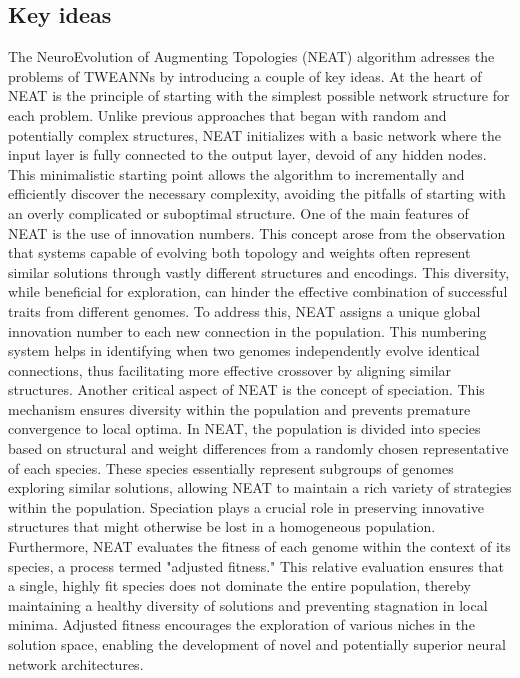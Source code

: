 \documentclass{article}
\begin{document}
\subsection{Key ideas}
The NeuroEvolution of Augmenting Topologies (NEAT) algorithm adresses the problems of TWEANNs by introducing a couple of key ideas.
At the heart of NEAT is the principle of starting with the simplest possible network structure for each problem. Unlike previous
approaches that began with random and potentially complex structures, NEAT initializes with a basic network where the input
layer is fully connected to the output layer, devoid of any hidden nodes. This minimalistic starting point allows the algorithm
to incrementally and efficiently discover the necessary complexity, avoiding the pitfalls of starting with an overly complicated or suboptimal structure.
One of the main features of NEAT is the use of innovation numbers. This concept arose from the observation that systems
capable of evolving both topology and weights often represent similar solutions through vastly different structures and encodings.
This diversity, while beneficial for exploration, can hinder the effective combination of successful traits from different genomes.
To address this, NEAT assigns a unique global innovation number to each new connection in the population. This numbering system helps 
in identifying when two genomes independently evolve identical connections, thus facilitating more effective crossover by aligning similar structures.
Another critical aspect of NEAT is the concept of speciation. This mechanism ensures diversity within the population and prevents
premature convergence to local optima. In NEAT, the population is divided into species based on structural and weight differences
from a randomly chosen representative of each species. These species essentially represent subgroups of genomes exploring similar 
solutions, allowing NEAT to maintain a rich variety of strategies within the population. Speciation plays a crucial role in preserving
innovative structures that might otherwise be lost in a homogeneous population.
Furthermore, NEAT evaluates the fitness of each genome within the context of its species, a process termed "adjusted fitness."
This relative evaluation ensures that a single, highly fit species does not dominate the entire population, thereby maintaining
a healthy diversity of solutions and preventing stagnation in local minima. Adjusted fitness encourages the exploration
of various niches in the solution space, enabling the development of novel and potentially superior neural network architectures.
\end{document}
